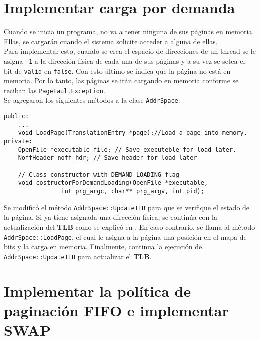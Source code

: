 \section{Implementar carga por demanda}
Cuando se inicia un programa, no va a tener ninguna de sus páginas en memoria. Ellas, se cargarán cuando el sistema solicite acceder a alguna de ellas.\\
Para implementar esto, cuando se crea el espacio de direcciones de un thread se le asigna \texttt{-{}1} a la dirección física de cada una de sus páginas y a su vez se setea el bit de \texttt{valid} en \texttt{false}. Con esto último se indica que la página no está en memoria. Por lo tanto, las páginas se irán cargando en memoria conforme se reciban las \texttt{PageFaultException}.\\
Se agregaron los siguientes métodos a la clase \texttt{AddrSpace}:
\begin{lstlisting}[style=C]
public:
    ...
    void LoadPage(TranslationEntry *page);//Load a page into memory.
private:
    OpenFile *executable_file; // Save executeble for load later.
    NoffHeader noff_hdr; // Save header for load later
    
    // Class constructor with DEMAND_LOADING flag
    void costructorForDemandLoading(OpenFile *executable,
                int prg_argc, char** prg_argv, int pid);
\end{lstlisting}
Se modificó el método \texttt{AddrSpace::UpdateTLB} para que se verifique el estado de la página. Si ya tiene asignada una dirección física, se continúa con la actualización del \textbf{TLB} como se explicó en . En caso contrario, se llama al método \texttt{AddrSpace::LoadPage}, el cual le asigna a la página una posición en el mapa de bits y la carga en memoria. Finalmente, continua la ejecución de \texttt{AddrSpace::UpdateTLB} para actualizar el \textbf{TLB}.
\section{Implementar la política de paginación FIFO e implementar SWAP}
